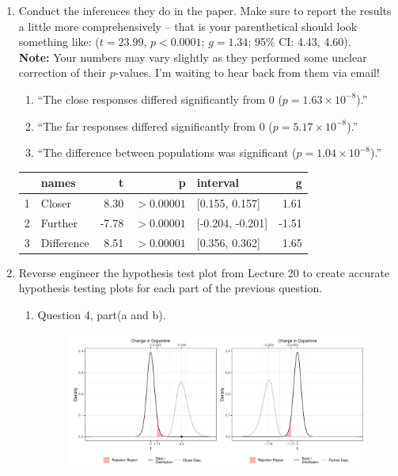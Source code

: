 \documentclass{article}\usepackage[]{graphicx}\usepackage[]{xcolor}
\begin{document}
\begin{enumerate}
\item Conduct the inferences they do in the paper. Make sure to report the results
a little more comprehensively -- that is your parenthetical should look something
like: ($t=23.99$, $p<0.0001$; $g=1.34$; 95\% CI: 4.43, 4.60).\\
\textbf{Note:} Your numbers may vary slightly as they performed some unclear
correction of their $p$-values. I'm waiting to hear back from them via email!
\begin{enumerate}
  \item ``The close responses differed significantly from 0 ($p=1.63 \times 10^{-8}$).''
  \item ``The far responses differed significantly from 0 ($p=5.17 \times 10^{-8}$).''
  \item ``The difference between populations was significant ($p=1.04 \times10^{-8}$).''
\end{enumerate}


\begin{table}[ht]
\centering
\begin{tabular}{rlrrlr}
  \hline
 & names & t & p & interval & g \\ 
  \hline
1 & Closer & 8.30 & $>0.00001$ & [0.155, 0.157] & 1.61 \\ 
  2 & Further & -7.78 & $>0.00001$ & [-0.204, -0.201] & -1.51 \\ 
  3 & Difference & 8.51 & $>0.00001$ & [0.356, 0.362] & 1.65 \\ 
   \hline
\end{tabular}
\end{table}

\item Reverse engineer the hypothesis test plot from Lecture 20 to create accurate
hypothesis testing plots for each part of the previous question.
\begin{enumerate}
  \item Question 4, part(a and b).
    \begin{figure}[ht]
    \centering
    \includegraphics[scale = 0.5]{comb.t.pdf}
    \end{figure}


\end{enumerate}
\end{enumerate}
\end{document}
